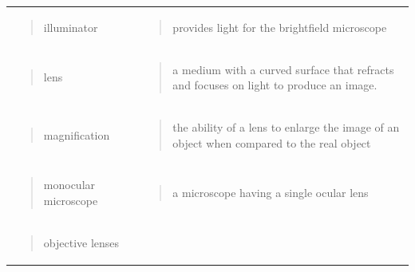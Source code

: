 \documentclass[
  letterpaper,
  DIV=11,
  numbers=noendperiod]{scrreprt}
\begin{document}
{\begin{longtable}[]{@{}
  >{\centering\arraybackslash}p{}
  >{\centering\arraybackslash}p{}@{}}
\begin{minipage}[t]{\linewidth}
\begin{quote}
illuminator
\end{quote}
\end{minipage} & \begin{minipage}[t]{\linewidth}\centering
\begin{quote}
provides light for the brightfield microscope
\end{quote}
\end{minipage} \\
\begin{minipage}[t]{\linewidth}\centering
\begin{quote}
lens
\end{quote}
\end{minipage} & \begin{minipage}[t]{\linewidth}\centering
\begin{quote}
a medium with a curved surface that refracts and focuses on light to
produce an image.
\end{quote}
\end{minipage} \\
\begin{minipage}[t]{\linewidth}\centering
\begin{quote}
magnification
\end{quote}
\end{minipage} & \begin{minipage}[t]{\linewidth}\centering
\begin{quote}
the ability of a lens to enlarge the image of an object when compared to
the real object
\end{quote}
\end{minipage} \\
\begin{minipage}[t]{\linewidth}\centering
\begin{quote}
monocular microscope
\end{quote}
\end{minipage} & \begin{minipage}[t]{\linewidth}\centering
\begin{quote}
a microscope having a single ocular lens
\end{quote}
\end{minipage} \\
\begin{minipage}[t]{\linewidth}\centering
\begin{quote}
objective lenses
\end{quote}
\end{minipage} & \begin{minipage}[t]{\linewidth}\centering

\end{minipage}
\end{longtable}}
\end{document}
